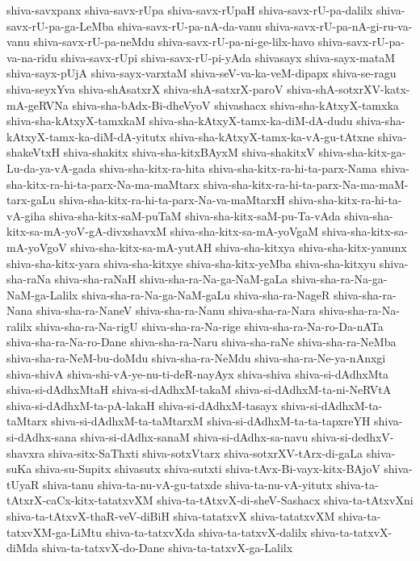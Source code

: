 {shiva-savxpanx
shiva-savx-rUpa
shiva-savx-rUpaH
shiva-savx-rU-pa-dalilx
shiva-savx-rU-pa-ga-LeMba
shiva-savx-rU-pa-nA-da-vanu
shiva-savx-rU-pa-nA-gi-ru-va-vanu
shiva-savx-rU-pa-neMdu
shiva-savx-rU-pa-ni-ge-lilx-havo
shiva-savx-rU-pa-va-na-ridu
shiva-savx-rUpi
shiva-savx-rU-pi-yAda
shivasayx
shiva-sayx-mataM
shiva-sayx-pUjA
shiva-sayx-varxtaM
shiva-seV-va-ka-veM-dipapx
shiva-se-ragu
shiva-seyxYva
shiva-shAsatxrX
shiva-shA-satxrX-paroV
shiva-shA-sotxrXV-katx-mA-geRVNa
shiva-sha-bAdx-Bi-dheVyoV
shivashacx
shiva-sha-kAtxyX-tamxka
shiva-sha-kAtxyX-tamxkaM
shiva-sha-kAtxyX-tamx-ka-diM-dA-dudu
shiva-sha-kAtxyX-tamx-ka-diM-dA-yitutx
shiva-sha-kAtxyX-tamx-ka-vA-gu-tAtxne
shiva-shakeVtxH
shiva-shakitx
shiva-sha-kitxBAyxM
shiva-shakitxV
shiva-sha-kitx-ga-Lu-da-ya-vA-gada
shiva-sha-kitx-ra-hita
shiva-sha-kitx-ra-hi-ta-parx-Nama
shiva-sha-kitx-ra-hi-ta-parx-Na-ma-maMtarx
shiva-sha-kitx-ra-hi-ta-parx-Na-ma-maM-tarx-gaLu
shiva-sha-kitx-ra-hi-ta-parx-Na-va-maMtarxH
shiva-sha-kitx-ra-hi-ta-vA-giha
shiva-sha-kitx-saM-puTaM
shiva-sha-kitx-saM-pu-Ta-vAda
shiva-sha-kitx-sa-mA-yoV-gA-divxshavxM
shiva-sha-kitx-sa-mA-yoVgaM
shiva-sha-kitx-sa-mA-yoVgoV
shiva-sha-kitx-sa-mA-yutAH
shiva-sha-kitxya
shiva-sha-kitx-yanunx
shiva-sha-kitx-yara
shiva-sha-kitxye
shiva-sha-kitx-yeMba
shiva-sha-kitxyu
shiva-sha-raNa
shiva-sha-raNaH
shiva-sha-ra-Na-ga-NaM-gaLa
shiva-sha-ra-Na-ga-NaM-ga-Lalilx
shiva-sha-ra-Na-ga-NaM-gaLu
shiva-sha-ra-NageR
shiva-sha-ra-Nana
shiva-sha-ra-NaneV
shiva-sha-ra-Nanu
shiva-sha-ra-Nara
shiva-sha-ra-Na-ralilx
shiva-sha-ra-Na-rigU
shiva-sha-ra-Na-rige
shiva-sha-ra-Na-ro-Da-nATa
shiva-sha-ra-Na-ro-Dane
shiva-sha-ra-Naru
shiva-sha-raNe
shiva-sha-ra-NeMba
shiva-sha-ra-NeM-bu-doMdu
shiva-sha-ra-NeMdu
shiva-sha-ra-Ne-ya-nAnxgi
shiva-shivA
shiva-shi-vA-ye-nu-ti-deR-nayAyx
shiva-shiva
shiva-si-dAdhxMta
shiva-si-dAdhxMtaH
shiva-si-dAdhxM-takaM
shiva-si-dAdhxM-ta-ni-NeRVtA
shiva-si-dAdhxM-ta-pA-lakaH
shiva-si-dAdhxM-tasayx
shiva-si-dAdhxM-ta-taMtarx
shiva-si-dAdhxM-ta-taMtarxM
shiva-si-dAdhxM-ta-ta-tapxreYH
shiva-si-dAdhx-sana
shiva-si-dAdhx-sanaM
shiva-si-dAdhx-sa-navu
shiva-si-dedhxV-shavxra
shiva-sitx-SaThxti
shiva-sotxVtarx
shiva-sotxrXV-tArx-di-gaLa
shiva-suKa
shiva-su-Supitx
shivasutx
shiva-sutxti
shiva-tAvx-Bi-vayx-kitx-BAjoV
shiva-tUyaR
shiva-tanu
shiva-ta-nu-vA-gu-tatxde
shiva-ta-nu-vA-yitutx
shiva-ta-tAtxrX-caCx-kitx-tatatxvXM
shiva-ta-tAtxvX-di-sheV-Sashacx
shiva-ta-tAtxvXni
shiva-ta-tAtxvX-thaR-veV-diBiH
shiva-tatatxvX
shiva-tatatxvXM
shiva-ta-tatxvXM-ga-LiMtu
shiva-ta-tatxvXda
shiva-ta-tatxvX-dalilx
shiva-ta-tatxvX-diMda
shiva-ta-tatxvX-do-Dane
shiva-ta-tatxvX-ga-Lalilx
}
